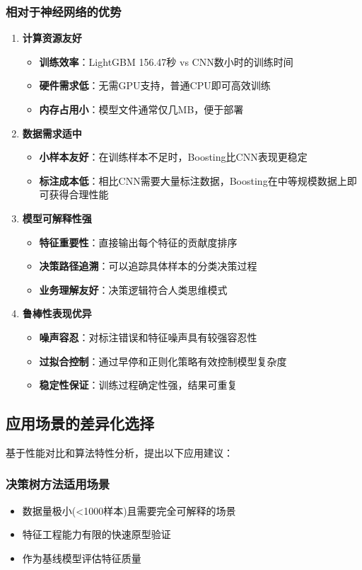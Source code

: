\documentclass[UTF8]{report}
\theoremstyle{MyLineTheoremStyle} %
\theoremstyle{MyBlockTheoremStyle} %
\theoremstyle{MySubsubsectionStyle} %
\begin{document}
\subsubsection{相对于神经网络的优势}
\begin{enumerate}
    \item \textbf{计算资源友好}
    \begin{itemize}
        \item \textbf{训练效率}：LightGBM 156.47秒 vs CNN数小时的训练时间
        \item \textbf{硬件需求低}：无需GPU支持，普通CPU即可高效训练
        \item \textbf{内存占用小}：模型文件通常仅几MB，便于部署
    \end{itemize}
    \item \textbf{数据需求适中}
    \begin{itemize}
        \item \textbf{小样本友好}：在训练样本不足时，Boosting比CNN表现更稳定
        \item \textbf{标注成本低}：相比CNN需要大量标注数据，Boosting在中等规模数据上即可获得合理性能
    \end{itemize}
    \item \textbf{模型可解释性强}
    \begin{itemize}
        \item \textbf{特征重要性}：直接输出每个特征的贡献度排序
        \item \textbf{决策路径追溯}：可以追踪具体样本的分类决策过程
        \item \textbf{业务理解友好}：决策逻辑符合人类思维模式
    \end{itemize}
    \item \textbf{鲁棒性表现优异}
    \begin{itemize}
        \item \textbf{噪声容忍}：对标注错误和特征噪声具有较强容忍性
        \item \textbf{过拟合控制}：通过早停和正则化策略有效控制模型复杂度
        \item \textbf{稳定性保证}：训练过程确定性强，结果可重复
    \end{itemize}
\end{enumerate}

\subsection{应用场景的差异化选择}
基于性能对比和算法特性分析，提出以下应用建议：
\subsubsection{决策树方法适用场景}
\begin{itemize}
    \item 数据量极小(<1000样本)且需要完全可解释的场景
    \item 特征工程能力有限的快速原型验证
    \item 作为基线模型评估特征质量
\end{itemize}
\end{document}

